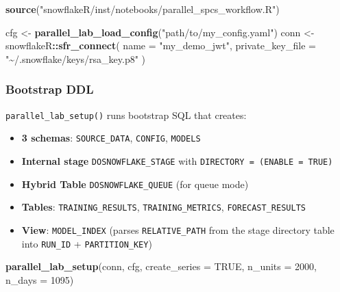 \documentclass[
]{article}
\newenvironment{Shaded}{\begin{snugshade}}{\end{snugshade}}
\newcommand{\AttributeTok}[1]{\textcolor[rgb]{0.13,0.29,0.53}{#1}}
\newcommand{\ConstantTok}[1]{\textcolor[rgb]{0.56,0.35,0.01}{#1}}
\newcommand{\DecValTok}[1]{\textcolor[rgb]{0.00,0.00,0.81}{#1}}
\newcommand{\FunctionTok}[1]{\textcolor[rgb]{0.13,0.29,0.53}{\textbf{#1}}}
\newcommand{\NormalTok}[1]{#1}
\newcommand{\OtherTok}[1]{\textcolor[rgb]{0.56,0.35,0.01}{#1}}
\newcommand{\SpecialCharTok}[1]{\textcolor[rgb]{0.81,0.36,0.00}{\textbf{#1}}}
\newcommand{\StringTok}[1]{\textcolor[rgb]{0.31,0.60,0.02}{#1}}
\providecommand{\tightlist}{%
  \setlength{\itemsep}{0pt}\setlength{\parskip}{0pt}}
\begin{document}
\begin{Shaded}
\begin{Highlighting}[]
\FunctionTok{source}\NormalTok{(}\StringTok{"snowflakeR/inst/notebooks/parallel\_spcs\_workflow.R"}\NormalTok{)}

\NormalTok{cfg  }\OtherTok{\textless{}{-}} \FunctionTok{parallel\_lab\_load\_config}\NormalTok{(}\StringTok{"path/to/my\_config.yaml"}\NormalTok{)}
\NormalTok{conn }\OtherTok{\textless{}{-}}\NormalTok{ snowflakeR}\SpecialCharTok{::}\FunctionTok{sfr\_connect}\NormalTok{(}
  \AttributeTok{name =} \StringTok{"my\_demo\_jwt"}\NormalTok{,}
  \AttributeTok{private\_key\_file =} \StringTok{"\textasciitilde{}/.snowflake/keys/rsa\_key.p8"}
\NormalTok{)}
\end{Highlighting}
\end{Shaded}

\subsubsection{Bootstrap DDL}\label{bootstrap-ddl}

\texttt{parallel\_lab\_setup()} runs bootstrap SQL that creates:

\begin{itemize}
\tightlist
\item
  \textbf{3 schemas}: \texttt{SOURCE\_DATA}, \texttt{CONFIG},
  \texttt{MODELS}
\item
  \textbf{Internal stage} \texttt{DOSNOWFLAKE\_STAGE} with
  \texttt{DIRECTORY\ =\ (ENABLE\ =\ TRUE)}
\item
  \textbf{Hybrid Table} \texttt{DOSNOWFLAKE\_QUEUE} (for queue mode)
\item
  \textbf{Tables}: \texttt{TRAINING\_RESULTS},
  \texttt{TRAINING\_METRICS}, \texttt{FORECAST\_RESULTS}
\item
  \textbf{View}: \texttt{MODEL\_INDEX} (parses \texttt{RELATIVE\_PATH}
  from the stage directory table into \texttt{RUN\_ID} +
  \texttt{PARTITION\_KEY})
\end{itemize}

\begin{Shaded}
\begin{Highlighting}[]
\FunctionTok{parallel\_lab\_setup}\NormalTok{(conn, cfg, }\AttributeTok{create\_series =} \ConstantTok{TRUE}\NormalTok{, }\AttributeTok{n\_units =} \DecValTok{2000}\NormalTok{, }\AttributeTok{n\_days =} \DecValTok{1095}\NormalTok{)}
\end{Highlighting}
\end{Shaded}
\end{document}
